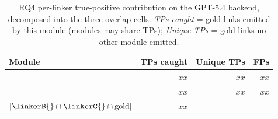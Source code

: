 %
\begin{table}[t]
\caption{RQ4 per-linker true-positive contribution on the GPT-5.4 backend, decomposed into the three overlap cells. \emph{TPs caught} = gold links emitted by this module (modules may share TPs); \emph{Unique TPs} = gold links no other module emitted.}
\label{tab:rq4-overlap}
\centering\small
\begin{tabular}{@{}lrrr@{}}
\toprule
Module & TPs caught & Unique TPs & FPs \\
\midrule
\linkerB{} & $xx$ & $xx$ & $xx$ \\
\linkerC{} & $xx$ & $xx$ & $xx$ \\
\midrule
$|\linkerB{} \cap \linkerC{} \cap \text{gold}|$ & $xx$ & -- & -- \\
\bottomrule
\end{tabular}
\end{table}

